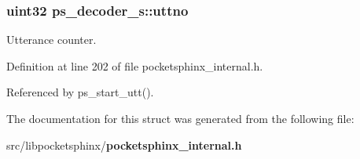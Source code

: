 \subsubsection[{uttno}]{\setlength{\rightskip}{0pt plus 5cm}uint32 ps\-\_\-decoder\-\_\-s\-::uttno}\label{structps__decoder__s_a0f597370dd162c2799efe216c9b991fc}


Utterance counter. 



Definition at line 202 of file pocketsphinx\-\_\-internal.\-h.



Referenced by ps\-\_\-start\-\_\-utt().



The documentation for this struct was generated from the following file\-:\begin{DoxyCompactItemize}
\item 
src/libpocketsphinx/{\bf pocketsphinx\-\_\-internal.\-h}\end{DoxyCompactItemize}

